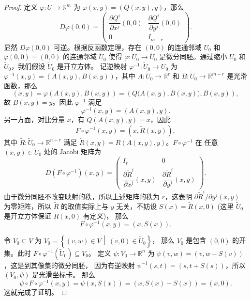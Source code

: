 \documentclass[fontset=none]{Notes}
\begin{document}
\begin{proof}
  定义 $\varphi:U\to\mathbb{R}^m$ 为 $\varphi(x,y)=\left(Q(x,y),y\right)$，那么
  \[
    D\varphi(0,0)=\begin{pmatrix}
      \dfrac{\partial Q^i}{\partial x^j}(0,0) &  \dfrac{\partial Q^i}{\partial y^j}(0,0)\\[4mm]
      0 & I_{m-r}
    \end{pmatrix}  .
  \]
  显然 $D\varphi(0,0)$ 可逆。根据反函数定理，存在 $(0,0)$ 的连通邻域 $U_0$
  和 $\varphi(0,0)=(0,0)$ 的连通邻域 $\tilde{U}_0$ 使得 $\varphi:U_0\to\tilde{U}_0$
  是微分同胚。通过缩小 $U_0$ 和 $\tilde{U}_0$，我们假设 $\tilde{U}_0$ 是开立方体。
  记逆映射 $\varphi^{-1}:\tilde{U}_0\to U_0$ 为
  $\varphi^{-1}(x,y)=\left(A(x,y),B(x,y)\right)$，其中 $A:\tilde{U}_0\to\mathbb{R}^r$
  和 $B:\tilde{U}_0\to\mathbb{R}^{m-r}$ 是光滑函数，那么
  \[
    (x,y)=\varphi\left(A(x,y),B(x,y)\right)=\left(Q\bigl(A(x,y),B(x,y)\bigr),B(x,y)\right),
  \]
  故 $B(x,y)=y$。因此 $\varphi^{-1}$ 满足
  \[
    \varphi^{-1}(x,y)=\left(A(x,y),y\right)  .
  \]
  另一方面，对比分量 $x$，有 $Q\left(A(x,y),y\right)=x$，因此
  \[
    F\circ\varphi^{-1}(x,y)=\left(x,\tilde{R}(x,y)\right)  ,
  \]
  其中 $\tilde{R}:\tilde{U}_0\to\mathbb{R}^{n-r}$ 满足
  $\tilde{R}(x,y)=R\left(A(x,y),y\right)$。$F\circ\varphi^{-1}$ 在
  任意 $(x,y)\in\tilde{U}_0$ 处的 Jacobi 矩阵为
  \[
    D\left(F\circ\varphi^{-1}\right)(x,y)=\begin{pmatrix}
      I_r & 0 \\[2mm]
      \dfrac{\partial \tilde{R}^i}{\partial x^j}(x,y) & 
      \dfrac{\partial \tilde{R}^i}{\partial y^j}(x,y)
    \end{pmatrix}.
  \]
  由于微分同胚不改变映射的秩，所以上述矩阵的秩为 $r$，这表明
  $\partial\tilde{R}^i/\partial y^j(x,y)$ 为零矩阵，所以 $\tilde{R}$
  的取值实际上与 $y$ 无关，不妨设 $S(x)=\tilde{R}(x,0)$ (这里 $\tilde{U}_0$ 是开立方体保证 $\tilde{R}(x,0)$ 有定义)，
  那么
  \[
    F\circ\varphi^{-1}(x,y)=\left(x,S(x)\right)  .
  \] 

  令 $V_0\subseteq V$ 为 $V_0=\left\{(v,w)\in V\,\middle|\, (v,0)\in\tilde{U}_0\right\}$，
  那么 $V_0$ 是包含 $(0,0)$ 的开集。此时 $F\circ\varphi^{-1}\left(\tilde{U}_0\right)\subseteq V_0$。
  定义 $\psi:V_0\to\mathbb{R}^n$ 为 $\psi(v,w)=(v,w-S(v))$，这是到其像集的微分同胚，
  因为有逆映射 $\psi^{-1}(s,t)=(s,t+S(s))$，所以 $(V_0,\psi)$ 是光滑坐标卡。
  那么
  \[
    \psi\circ F\circ\varphi^{-1}(x,y)=\psi(x,S(x))=(x,S(x)-S(x))=(x,0) .
  \]
  这就完成了证明。
\end{proof}
\end{document}
